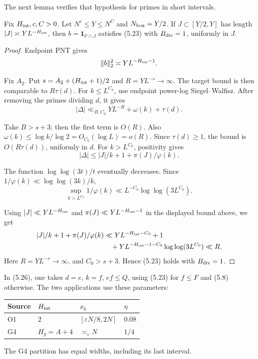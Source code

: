 The next lemma verifies that hypothesis for primes in short intervals.

\begin{lemma}
Fix $H_{\rm int},c,C>0$.
Let $N^c\le Y\le N^C$ and $N_{\rm box}=Y/2$.
If $J\subset[Y/2,Y]$ has length $|J|\asymp YL^{-H_{\rm int}}$,
then $b=\mathbf1_{\mathbb P\cap J}$ satisfies (5.23)
with $B_{\rm div}=1$, uniformly in $J$.
\end{lemma}

\begin{proof}
Endpoint PNT gives
\[
\|b\|_2^2\asymp YL^{-H_{\rm int}-1}.
\]

Fix $A_2$.
Put $s=A_2+(H_{\rm int}+1)/2$ and $R=YL^{-s}\to\infty$.
The target bound is then comparable to $R\tau(d)$.
For $k\le L^{C_0}$, use endpoint power-log Siegel--Walfisz.
After removing the primes dividing $d$, it gives
\[
|\Delta|\ll_{B,C_0}YL^{-B}+\omega(k)+\tau(d).
\]

Take $B>s+3$; then the first term is $O(R)$.
Also $\omega(k)\le\log k/\log2=O_{C_0}(\log L)=o(R)$.
Since $\tau(d)\ge1$, the bound is $O(R\tau(d))$, uniformly in $d$.
For $k>L^{C_0}$, positivity gives
\[
|\Delta|\le |J|/k+1+\pi(J)/\varphi(k).
\]

The function $\log\log(3t)/t$ eventually decreases.
Since $1/\varphi(k)\ll\log\log(3k)/k$,
\[
\sup_{k>L^{C_0}}1/\varphi(k)\ll L^{-C_0}\log\log(3L^{C_0}).
\]

Using $|J|\ll YL^{-H_{\rm int}}$ and
$\pi(J)\ll YL^{-H_{\rm int}-1}$ in the displayed bound above, we get
\[
\begin{aligned}
 |J|/k+1+\pi(J)/\varphi(k)
 &\ll YL^{-H_{\rm int}-C_0}+1\\
 &\quad+YL^{-H_{\rm int}-1-C_0}\log\log(3L^{C_0})
 \ll R.
\end{aligned}
\]
Here $R=YL^{-s}\to\infty$, and $C_0>s+3$.
Hence (5.23) holds with $B_{\rm div}=1$.
\end{proof}

In (5.26), one takes $d=e$, $k=f$, $ef\le Q$,
using (5.23) for $f\le F$ and (5.8) otherwise.
The two applications use these parameters:
\begin{center}
\begin{tabular}{@{}llll@{}}
\toprule
Source & $H_{\rm int}$ & $x_b$ & $\eta$ \\
\midrule
O1 & $2$ & $[\varepsilon N/8,2N]$ & $0.08$ \\
G4 & $H_g=A+4$ & $\asymp_\varepsilon N$ & $1/4$ \\
\bottomrule
\end{tabular}
\end{center}
The G4 partition has equal widths, including its last interval.

